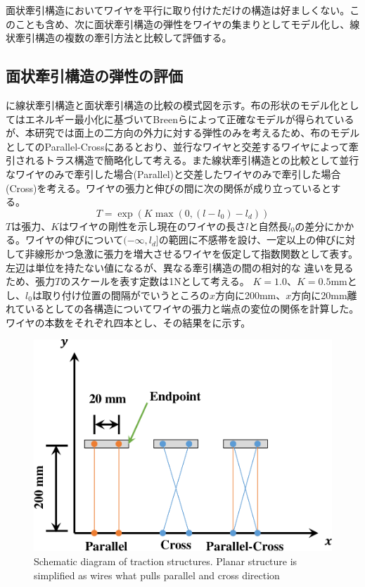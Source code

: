 \documentclass{jarticle}
\begin{document}
面状牽引構造においてワイヤを平行に取り付けただけの構造は好ましくない。このことも含め、次に面状牽引構造の弾性をワイヤの集まりとしてモデル化し、線状牽引構造の複数の牽引方法と比較して評価する。

\subsection{面状牽引構造の弾性の評価}\label{sec:hoge}
に線状牽引構造と面状牽引構造の比較の模式図を示す。布の形状のモデル化としてはエネルギー最小化に基づいてBreen\cite{Breen:1994}らによって正確なモデルが得られているが、本研究では面上の二方向の外力に対する弾性のみを考えるため、布のモデルとしてのParallel-Crossにあるとおり、並行なワイヤと交差するワイヤによって牽引されるトラス構造で簡略化して考える。また線状牽引構造との比較として並行なワイヤのみで牽引した場合(Parallel)と交差したワイヤのみで牽引した場合(Cross)を考える。ワイヤの張力と伸びの間に次の関係が成り立っているとする。
\begin{equation}
  T = \exp(K\max(0,(l-l_0) - l_d))
\end{equation}
${T}$は張力、${K}$はワイヤの剛性を示し現在のワイヤの長さ${l}$と自然長${l_0}$の差分にかかる。ワイヤの伸びについて$(-\infty,l_d]$の範囲に不感帯を設け、一定以上の伸びに対して非線形かつ急激に張力を増大させるワイヤを仮定して指数関数として表す。左辺は単位を持たない値になるが、異なる牽引構造の間の相対的な
違いを見るため、張力${T}$のスケールを表す定数は1Nとして考える。
${K=1.0}$、${K=0.5}$mmとし、${l_0}$は取り付け位置の間隔がでいうところの${x}$方向に200mm、${x}$方向に20mm離れているとしての各構造についてワイヤの張力と端点の変位の関係を計算した。ワイヤの本数をそれぞれ四本とし、その結果をに示す。

\begin{figure}[tb]
 \centering
  \includegraphics[width=0.7\columnwidth]{figs/schematic-comparison-of-ligaments.pdf}
  \vspace*{-4mm}
  \caption{Schematic diagram of traction structures. Planar structure is simplified as wires what pulls parallel and cross direction}
  \label{fig:comparison}
\end{figure}
\end{document}
